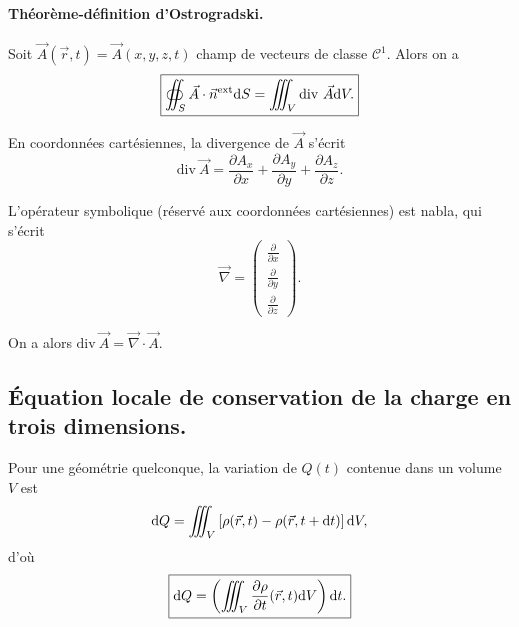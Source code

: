         \paragraph{Théorème-définition d'Ostrogradski.}

            Soit $\vec{A}(\vec{r},t)=\vec{A}(x,y,z,t)$ champ de vecteurs de classe $\mathcal{C}^{1}$. Alors on a 
            \begin{equation*}
                \boxed{
                    \oiint_{S}\vec{A}\cdot\vec{n}^{\text{ext}}\mathrm{d} S=\iiint_{V}\mathrm{div}~\vec{A}\mathrm{d} V.
                }
            \end{equation*}

            En coordonnées cartésiennes, la divergence de $\vec{A}$ s'écrit 
            \begin{equation*}
                \boxed{
                    \mathrm{div}~\vec{A}=\frac{\partial A_x}{\partial x}+\frac{\partial A_y}{\partial y}+\frac{\partial A_z}{\partial z}.
                }
            \end{equation*}

            L'opérateur symbolique (réservé aux coordonnées cartésiennes) est \og nabla\fg, qui s'écrit
            \begin{equation*}
                \boxed{
                    \vec{\nabla}=\begin{pmatrix}
                        \frac{\partial}{\partial x}\\[0.2cm]
                        \frac{\partial}{\partial y}\\[0.2cm]
                        \frac{\partial}{\partial z}
                    \end{pmatrix}.
                }
            \end{equation*}

            On a alors $\mathrm{div}~\vec{A}=\vec{\nabla}\cdot\vec{A}$.

    \subsection{Équation locale de conservation de la charge en trois dimensions.}

        Pour une géométrie quelconque, la variation de $Q(t)$ contenue dans un volume $V$ est 
        \begin{equation*}
            \mathrm{d} Q=\iiint_{V}\left[\rho(\vec{r},t)-\rho(\vec{r},t+\mathrm{d} t)\right]\mathrm{d} V,
        \end{equation*}
        d'où 
        \begin{equation*}
            \boxed{
                \mathrm{d} Q=\left(\iiint_{V}\frac{\partial \rho}{\partial t}(\vec{r},t)\mathrm{d} V\right)\mathrm{d} t.
            }
        \end{equation*}

